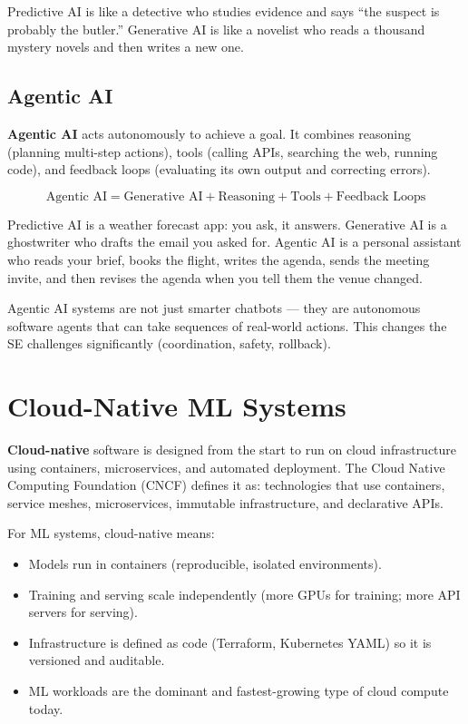 \documentclass[a4paper,11pt]{article}
\newcommand{\vocab}[1]{\textbf{\color{navy}#1}}
\begin{document}
\begin{intuition}
Predictive AI is like a detective who studies evidence and says ``the suspect is probably the butler.'' Generative AI is like a novelist who reads a thousand mystery novels and then writes a new one.
\end{intuition}

\subsection{Agentic AI}

\vocab{Agentic AI} acts autonomously to achieve a goal. It combines reasoning (planning multi-step actions), tools (calling APIs, searching the web, running code), and feedback loops (evaluating its own output and correcting errors).

\[
\text{Agentic AI} = \text{Generative AI} + \text{Reasoning} + \text{Tools} + \text{Feedback Loops}
\]

\begin{everyday}
Predictive AI is a weather forecast app: you ask, it answers. Generative AI is a ghostwriter who drafts the email you asked for. Agentic AI is a personal assistant who reads your brief, books the flight, writes the agenda, sends the meeting invite, and then revises the agenda when you tell them the venue changed.
\end{everyday}

\begin{keytake}
Agentic AI systems are not just smarter chatbots --- they are autonomous software agents that can take sequences of real-world actions. This changes the SE challenges significantly (coordination, safety, rollback).
\end{keytake}

\section{Cloud-Native ML Systems}

\vocab{Cloud-native} software is designed from the start to run on cloud infrastructure using containers, microservices, and automated deployment. The Cloud Native Computing Foundation (CNCF) defines it as: technologies that use containers, service meshes, microservices, immutable infrastructure, and declarative APIs.

For ML systems, cloud-native means:
\begin{itemize}
  \item Models run in containers (reproducible, isolated environments).
  \item Training and serving scale independently (more GPUs for training; more API servers for serving).
  \item Infrastructure is defined as code (Terraform, Kubernetes YAML) so it is versioned and auditable.
  \item ML workloads are the dominant and fastest-growing type of cloud compute today.
\end{itemize}
\end{document}
